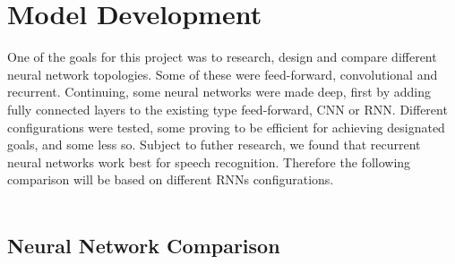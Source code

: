 \chapter{Model Development}\label{ch:model_development}
One of the goals for this project was to research, design and compare different neural network topologies. 
Some of these were feed-forward, convolutional and recurrent.
Continuing, some neural networks were made deep, first by adding fully connected layers to the existing type feed-forward, CNN or RNN.
Different configurations were tested, some proving to be efficient for achieving designated goals, and some less so.
Subject to futher research, we found that recurrent neural networks work best for speech recognition.
Therefore  the following comparison will be based on different RNNs configurations.\\\\

\section{Neural Network Comparison}

